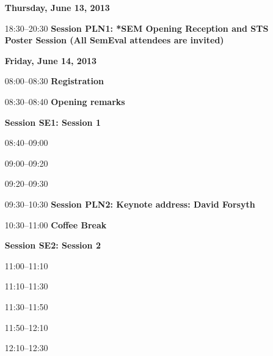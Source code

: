 \begin{itemize}

\item[] {\Large\bfseries Thursday, June 13, 2013}\\\vspace{1.5ex}

\vspace{1ex}
\item[18:30--20:30] {\bfseries  Session PLN1: *SEM Opening Reception and STS Poster Session (All SemEval attendees are invited)}

\item[] {\Large\bfseries Friday, June 14, 2013}\\\vspace{1.5ex}

\vspace{1ex}
\item[08:00--08:30] {\bfseries  Registration}

\vspace{1ex}
\item[08:30--08:40] {\bfseries  Opening remarks}

\vspace{1ex}
\item[] {\bfseries Session SE1: Session 1}
\item[08:40--09:00] 
\item[09:00--09:20] 
\item[09:20--09:30] 

\vspace{1ex}
\item[09:30--10:30] {\bfseries  Session PLN2: Keynote address: David Forsyth}

\vspace{1ex}
\item[10:30--11:00] {\bfseries  Coffee Break}

\vspace{1ex}
\item[] {\bfseries Session SE2: Session 2}
\item[11:00--11:10] 
\item[11:10--11:30] 
\item[11:30--11:50] 
\item[11:50--12:10] 
\item[12:10--12:30] 


\end{itemize}
